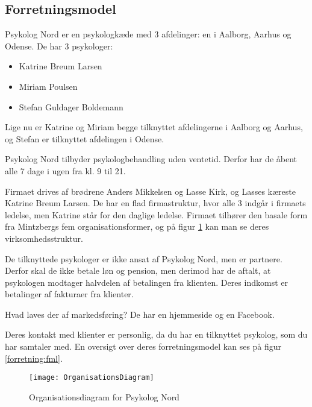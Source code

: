 \subsection{Forretningsmodel}
Psykolog Nord er en psykologkæde med 3 afdelinger: en i Aalborg, Aarhus og Odense. De har 3 psykologer:

\begin{itemize}
    \item Katrine Breum Larsen
    \item Miriam Poulsen
    \item Stefan Guldager Boldemann
\end{itemize}

Lige nu er Katrine og Miriam begge tilknyttet afdelingerne i Aalborg og Aarhus, og Stefan er tilknyttet afdelingen i Odense.

Psykolog Nord tilbyder psykologbehandling uden ventetid.
Derfor har de åbent alle 7 dage i ugen fra kl. 9 til 21.

Firmaet drives af brødrene Anders Mikkelsen og Lasse Kirk, og Lasses kæreste Katrine Breum Larsen.
De har en flad firmastruktur, hvor alle 3 indgår i firmaets ledelse, men Katrine står for den daglige ledelse. 
Firmaet tilhører den basale form fra Mintzbergs fem organisationsformer, og på figur \ref{forretning:organisationsdiagram} kan man se deres virksomhedsstruktur.

De tilknyttede psykologer er ikke ansat af Psykolog Nord, men er partnere.
Derfor skal de ikke betale løn og pension, men derimod har de aftalt, at psykologen modtager halvdelen af betalingen fra klienten.
Deres indkomst er betalinger af fakturaer fra klienter.

Hvad laves der af markedsføring? De har en hjemmeside og en Facebook.

Deres kontakt med klienter er personlig, da du har en tilknyttet psykolog, som du har samtaler med. En oversigt over deres forretningsmodel kan ses på figur \ref{forretning:fml}.
\begin{figure}
    \caption{Organisationsdiagram for Psykolog Nord}
    \centering
        \texttt{[image: OrganisationsDiagram]}
    \label{forretning:organisationsdiagram}
    
\end{figure}

